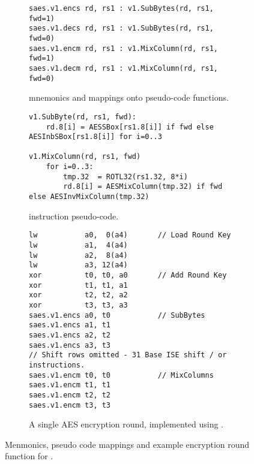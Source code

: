 
%


\begin{figure}[h]
\begin{subfigure}{\textwidth}
\begin{lstlisting}[language=pseudo,style=block]
saes.v1.encs rd, rs1 : v1.SubBytes(rd, rs1, fwd=1)
saes.v1.decs rd, rs1 : v1.SubBytes(rd, rs1, fwd=0)
saes.v1.encm rd, rs1 : v1.MixColumn(rd, rs1, fwd=1)
saes.v1.decm rd, rs1 : v1.MixColumn(rd, rs1, fwd=0)
\end{lstlisting}
\caption{
 mnemonics and mappings onto pseudo-code functions.
}
\label{fig:mnemonics:v1}
\end{subfigure}
\begin{subfigure}{\textwidth}
\begin{lstlisting}[language=pseudo,style=block]
v1.SubByte(rd, rs1, fwd):
    rd.8[i] = AESSBox[rs1.8[i]] if fwd else AESInbSBox[rs1.8[i]] for i=0..3

v1.MixColumn(rd, rs1, fwd)
    for i=0..3:
        tmp.32  = ROTL32(rs1.32, 8*i)
        rd.8[i] = AESMixColumn(tmp.32) if fwd else AESInvMixColumn(tmp.32)
\end{lstlisting}
\caption{
     instruction pseudo-code.
}
\label{fig:pseudo:v1}
\end{subfigure}
\begin{subfigure}{\textwidth}
\begin{lstlisting}[language=pseudo,style=block]
lw           a0,  0(a4)       // Load Round Key
lw           a1,  4(a4)
lw           a2,  8(a4)
lw           a3, 12(a4)
xor          t0, t0, a0       // Add Round Key
xor          t1, t1, a1
xor          t2, t2, a2
xor          t3, t3, a3
saes.v1.encs a0, t0           // SubBytes
saes.v1.encs a1, t1
saes.v1.encs a2, t2
saes.v1.encs a3, t3
// Shift rows omitted - 31 Base ISE shift / or instructions.
saes.v1.encm t0, t0           // MixColumns
saes.v1.encm t1, t1
saes.v1.encm t2, t2
saes.v1.encm t3, t3
\end{lstlisting}
\caption{
A single AES encryption round, implemented using .
}
\label{fig:round:v1}
\end{subfigure}
\caption{
    Menmonics, pseudo code mappings and example encryption
    round function for .
}
\end{figure}
